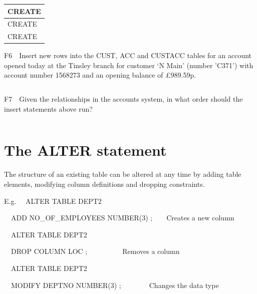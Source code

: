\begin{flushleft}
\tablefirsthead{}
\tablehead{}
\tabletail{}
\tablelasttail{}
\begin{supertabular}{|m{14.663cm}|}
\hline
CREATE

\\\hline
CREATE

\\\hline
CREATE

\\\hline
\end{supertabular}
\end{flushleft}
F6\ \ Insert new rows into the CUST, ACC and CUSTACC tables for an account opened today at the Tinsley branch for customer  {}`N Main' (number 'C371') with account number 1568273 and an opening balance of £989.59p.

\begin{flushleft}
\tablefirsthead{}
\tablehead{}
\tabletail{}
\tablelasttail{}
\begin{supertabular}{|m{14.663cm}|}
\hline
\\\hline
\end{supertabular}
\end{flushleft}
F7\ \ Given the relationships in the accounts system, in what order should the insert statements above run?

\begin{flushleft}
\tablefirsthead{}
\tablehead{}
\tabletail{}
\tablelasttail{}
\begin{supertabular}{|m{14.663cm}|}
\hline
\\\hline
\end{supertabular}
\end{flushleft}


\section{The ALTER statement}
The structure of an existing table can be altered at any time by adding table elements, modifying column definitions and dropping constraints.

E.g. \ \ ALTER TABLE DEPT2

\ \ ADD NO\_OF\_EMPLOYEES NUMBER(3) ;\ \ \ \ Creates a new column

 \ \ ALTER TABLE DEPT2

\ \ DROP COLUMN LOC ;\ \ \ \ \ \ \ \ \ \ Removes a column

\ \ ALTER TABLE DEPT2

\ \ MODIFY DEPTNO NUMBER(3) ;\ \ \ \ \ \ \ \ Changes the data type

